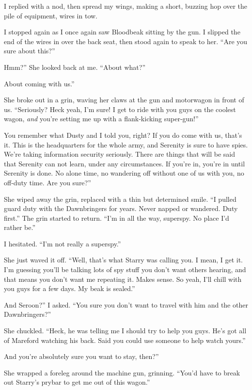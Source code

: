 I replied with a nod, then spread my wings, making a short, buzzing hop over the pile of equipment, wires in tow.

I stopped again as I once again saw Bloodbeak sitting by the gun. I slipped the end of the wires in over the back seat, then stood again to speak to her. “Are you sure about this?”

\leavevmode{}Hmm?” She looked back at me. “About what?”

\leavevmode{}About coming with us.”

She broke out in a grin, waving her claws at the gun and motorwagon in front of us. “Seriously? Heck yeah, I’m sure! I get to ride with you guys on the coolest wagon, \textit{and} you’re setting me up with a flank-kicking super-gun!”

\leavevmode{}You remember what Dusty and I told you, right? If you do come with us, that’s it. This is the headquarters for the whole army, and Serenity is sure to have spies. We’re taking information security seriously. There are things that will be said that Serenity can not learn, under any circumstances. If you’re in, you’re in until Serenity is done. No alone time, no wandering off without one of us with you, no off-duty time. Are you sure?”

She wiped away the grin, replaced with a thin but determined smile. “I pulled guard duty with the Dawnbringers for years. Never napped or wandered. Duty first.” The grin started to return. “I’m in all the way, superspy. No place I’d rather be.”

I hesitated. “I’m not really a superspy.”

She just waved it off. “Well, that’s what Starry was calling you. I mean, I get it. I’m guessing you’ll be talking lots of spy stuff you don’t want others hearing, and that means you don’t want me repeating it. Makes sense. So yeah, I’ll chill with you guys for a few days. My beak is sealed.”

\leavevmode{}And Seroon?” I asked. “You sure you don’t want to travel with him and the other Dawnbringers?”

She chuckled. “Heck, he was telling me I should try to help you guys. He’s got all of Mareford watching his back. Said you could use someone to help watch yours.”

\leavevmode{}And you’re absolutely sure you want to stay, then?”

She wrapped a foreleg around the machine gun, grinning. “You’d have to break out Starry’s prybar to get me out of this wagon.”

